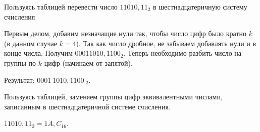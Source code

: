 \begin{example}
    \task%
    Пользуясь таблицей перевести число $11010{,}11_{2}$ в шестнадцатеричную систему счисления

    \solution%
    Первым делом, добавим незначащие нули так, чтобы число цифр было кратно $k$ (в данном случае $k = 4$). Так как число дробное, не забываем добавлять нули и в конце числа. Получим $00011010{,}1100_{2}$.
    Теперь необходимо разбить число на группы по $k$ цифр (начинаем от запятой).

    Результат: $\boxed{0001}~\boxed{1010}{,}\boxed{1100}~_{2}$.

    Пользуясь таблицей, заменяем группы цифр эквивалентными числами, записанным в шестнадцатеричной системе счисления.

    \answer%
    $11010{,}11_{2} = 1A{,}C_{16}$.
\end{example}
